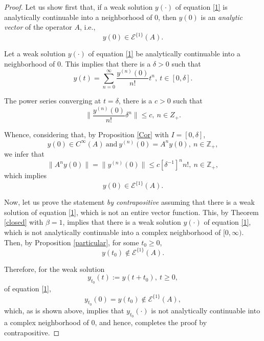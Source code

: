 \documentclass{amsart}
\theoremstyle{plain}
\theoremstyle{definition}
\begin{document}
\begin{proof}
Let us show first that, if a weak solution $y(\cdot)$ of 
equation \eqref{1} is analytically continuable into a neighborhood of $0$, then $y(0)$ is an {\it analytic vector} of the operator $A$, i.e.,
\begin{equation*}
y(0)\in {\mathscr E}^{\{1\}}(A).
\end{equation*}

Let a weak solution $y(\cdot)$ of equation \eqref{1}
be analytically continuable
into a neighborhood of $0$. This implies that there is a
$\delta>0$ such that
\begin{equation*}
y(t)=\sum_{n=0}^\infty \dfrac{y^{(n)}(0)}{n!}t^n,\ t\in [0,\delta].
\end{equation*}

The power series converging at $t=\delta$, there is a $c>0$ such that
\begin{equation*}
\biggl\|\dfrac{y^{(n)}(0)}{n!}\delta^n\biggr\|\le c,\ n\in Z_+.
\end{equation*}

Whence, considering that, by Proposition \ref{Cor} with $I=[0,\delta]$,
\[
y(0)\in C^\infty(A)\ \text{and}\ y^{(n)}(0)=A^n y(0),\
n\in{{\mathbb Z}}_+,
\]
we infer that
\begin{equation*}
\|A^ny(0)\|=\|y^{(n)}(0)\|\le c\left[\delta^{-1}\right]^n n!,\ n\in{{\mathbb Z}}_+,
\end{equation*}
which implies
\begin{equation*}
y(0)\in {\mathscr E}^{\{1\}}(A).
\end{equation*}

Now, let us prove the statement {\it by contrapositive}
assuming that there is a weak solution of 
equation \eqref{1}, which is not an entire vector function. This, by Theorem \ref{closed} with $\beta=1$, implies that there is a weak solution $y(\cdot)$ of 
equation \eqref{1}, which is not analytically continuable into a complex neighborhood of $[0,\infty)$. Then, by Proposition \ref{particular}, for some
$t_0\ge 0$,
\[
y(t_0)\not \in {\mathscr E}^{\{1\}}(A).
\]

Therefore, for the weak solution
\[
y_{t_0}(t):=y(t+t_0),\ t\ge 0,
\]
of equation \eqref{1},
\[
y_{t_0}(0)=y(t_0)\notin {\mathscr E}^{\{1\}}(A),
\]
which, as is shown above, implies that $y_{t_0}(\cdot)$
is not analytically continuable into a complex neighborhood of $0$, and hence, completes the proof by contrapositive.
\end{proof}
\end{document}
